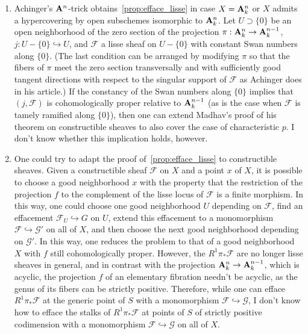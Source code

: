\documentclass[deligne.tex]{subfiles}
\begin{document}
\begin{remark}\begin{enumerate}
	\item Achinger's $\mathbf{A}^n$-trick obtains~\eqref{prop:efface_lisse} in case
	$X=\mathbf{A}^n_k$ or $X$ admits a hypercovering by open subschemes 	isomorphic to $\mathbf{A}^n_k$. Let $U\supset \{0\}$ be an open neighborhood of
	the zero section of the projection $\pi:\mathbf{A}^n_k\rightarrow\mathbf{A}^{n-1}_k$,
	$j:U-\{0\}\hookrightarrow U$, and $\mathcal F$ a lisse sheaf on $U-\{0\}$
	with constant Swan numbers along $\{0\}$. (The last condition can be 
	arranged by modifying $\pi$ so that the fibers of $\pi$ meet the zero
	section transversally and with sufficiently good tangent directions
	with respect to the singular support of $\mathcal F$ as Achinger does in
	his article.) If the constancy of the Swan numbers along $\{0\}$ implies
	that $(j,\mathcal F)$ is cohomologically proper relative to $\mathbf{A}^{n-1}_k$
	(as is the case when $\mathcal F$ is tamely ramified along $\{0\}$), then
	one can extend Madhav's proof of his theorem on constructible sheaves to
	also cover the case of characteristic $p$. I don't know whether this
	implication holds, however.
	\item One could try to adapt the proof of~\eqref{prop:efface_lisse} to 
	constructible sheaves.
	Given a constructible sheaf $\mathcal F$ on $X$ and a point $x$ of $X$,
	it is possible to choose a good neighborhood $x$ with the property that
	the restriction of the projection $f$ to the complement of the lisse
	locus of $\mathcal F$ is a finite morphism. In this way, one could choose
	one good neighborhood $U$ depending on $\mathcal F$, find an effacement
	$\mathcal F_U\hookrightarrow G$ on $U$, extend this effacement to a
	monomorphism $\mathcal F\hookrightarrow\mathcal G'$ on all of $X$, and
	then choose the next good neighborhood depending on $\mathcal G'$.
	In this way, one reduces the problem to that of a good neighborhood $X$ 
	with $f$ still cohomologically proper.
	However, the $R^1\pi_*\mathcal F$ are no longer lisse sheaves in general,
	and in contrast with the projection $\mathbf{A}^n_k\rightarrow\mathbf{A}^{n-1}_k$, which is
	acyclic, the projection $f$ of an elementary fibration needn't be 
	acyclic, as the genus of its fibers can be strictly positive.
	Therefore, while one can efface $R^1\pi_*\mathcal F$ at the generic point
	of $S$ with a monomorphism $\mathcal F\hookrightarrow\mathcal G$, I don't
	know how to efface the stalks of $R^1\pi_*\mathcal F$ at points of $S$ of
	strictly positive codimension with a monomorphism
	$\mathcal F\hookrightarrow\mathcal G$ on all of $X$.
\end{enumerate}
\end{remark}
\end{document}
